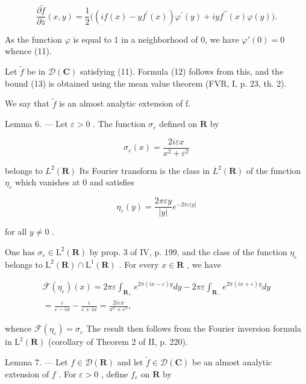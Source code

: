 \[
\frac {\partial \widetilde {f}}{\partial \overline {{z}}} (x, y) = \frac {1}{2} \Big ((i f (x) - y f ^ {\prime} (x)) \varphi^ {\prime} (y) + i y f ^ {\prime \prime} (x) \varphi (y) \Big).
\]

As the function \(\varphi\) is equal to 1 in a neighborhood of 0, we have \(\varphi'(0) = 0\) whence (11).

Let \(\tilde{f}\) be in \(\mathcal{D}(\mathbf{C})\) satisfying (11). Formula (12) follows from this, and the bound (13) is obtained using the mean value theorem (FVR, I, p. 23, th. 2).

We say that \(\tilde{f}\) is an almost analytic extension of f.

Lemma 6. --- Let \(\varepsilon > 0\) . The function \(\sigma_{\varepsilon}\) defined on \(\mathbf{R}\) by

\[
\sigma_ {\varepsilon} (x) = \frac {2 i \varepsilon x}{x ^ {2} + \varepsilon^ {2}}
\]

belongs to \(L^{2}(\mathbf{R})\) Its Fourier transform is the class in \(L^{2}(\mathbf{R})\) of the function \(\eta_{\varepsilon}\) which vanishes at 0 and satisfies

\[
\eta_ {\varepsilon} (y) = \frac {2 \pi \varepsilon y}{| y |} e ^ {- 2 \pi \varepsilon | y |}
\]

for all \(y \neq 0\) .

One has \(\sigma_{\varepsilon} \in \mathrm{L}^{2}(\mathbf{R})\) by prop. 3 of IV, p. 199, and the class of the function \(\eta_{\varepsilon}\) belongs to \(\mathrm{L}^{2}(\mathbf{R}) \cap \mathrm{L}^{1}(\mathbf{R})\) . For every \(x \in \mathbf{R}\) , we have

\[
\begin{array}{r} \overline {{\mathcal {F}}} (\eta_ {\varepsilon}) (x) = 2 \pi \varepsilon \int_ {\mathbf {R} _ {+}} e ^ {2 \pi (i x - \varepsilon) y} d y - 2 \pi \varepsilon \int_ {\mathbf {R} _ {-}} e ^ {2 \pi (i x + \varepsilon) y} d y \\ = \frac {\varepsilon}{\varepsilon - i x} - \frac {\varepsilon}{\varepsilon + i x} = \frac {2 i \varepsilon x}{x ^ {2} + \varepsilon^ {2}}, \end{array}
\]

whence \(\overline{\mathcal{F}}(\eta_{\varepsilon}) = \sigma_{\varepsilon}\) The result then follows from the Fourier inversion formula in \(\mathrm{L}^2(\mathbf{R})\) (corollary of Theorem 2 of II, p. 220).

Lemma 7. --- Let \(f \in \mathcal{D}(\mathbf{R})\) and let \(\widetilde{f} \in \mathcal{D}(\mathbf{C})\) be an almost analytic extension of \(f\) . For \(\varepsilon > 0\) , define \(f_{\varepsilon}\) on \(\mathbf{R}\) by

